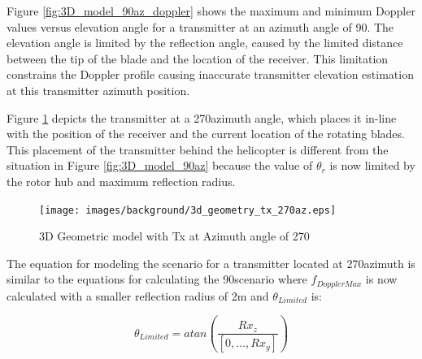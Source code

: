 Figure \ref{fig:3D_model_90az_doppler} shows the maximum and minimum Doppler values versus elevation angle for a transmitter at an azimuth angle of 90\textdegree. The elevation angle is limited by the reflection angle, caused by the limited distance between the tip of the blade and the location of the receiver. This limitation constrains the Doppler profile causing inaccurate transmitter elevation estimation at this transmitter azimuth position.

Figure \ref{fig:3D_model_270az} depicts the transmitter at a 270\textdegree \space azimuth angle, which places it in-line with the position of the receiver and the current location of the rotating blades. This placement of the transmitter behind the helicopter is different from the situation in Figure \ref{fig:3D_model_90az} because the value of $\theta_r$ is now limited by the  rotor hub and maximum reflection radius.

\begin{figure}
	\begin{center}
		\texttt{[image: images/background/3d\_geometry\_tx\_270az.eps]}
		\caption{3D Geometric model with Tx at Azimuth angle of 270\textdegree}
		\label{fig:3D_model_270az}
	\end{center}
\end{figure}

The equation for modeling the scenario for a transmitter located at 270\textdegree \space azimuth is similar to the equations for calculating the 90\textdegree \space scenario where $f_{DopplerMax}$ is now calculated with a smaller reflection radius of 2m and $\theta_{Limited}$ is:

\begin{equation}
	\theta_{Limited} = atan\left(\frac{Rx_z}{[0, \dots, Rx_y]}\right)
	\label{eq:theory_270_limited}
\end{equation}

